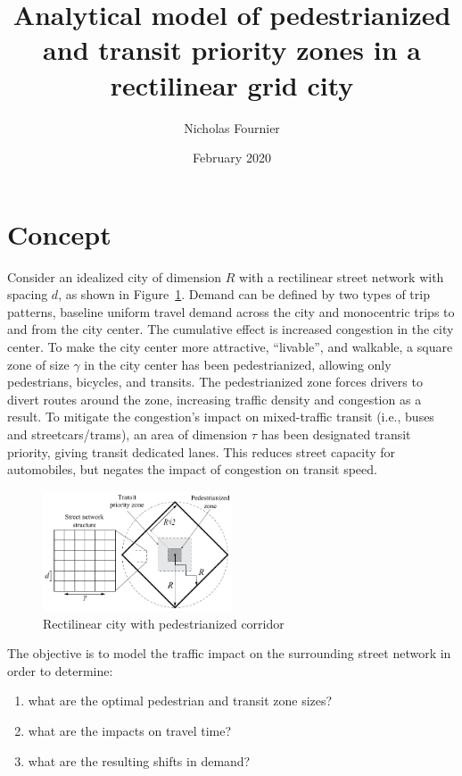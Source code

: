 \documentclass{article}
\title{Analytical model of pedestrianized and transit priority zones in a rectilinear grid city}
\author{Nicholas Fournier}
\date{February 2020}
\begin{document}
\maketitle

\section{Concept}
Consider an idealized city of dimension $R$ with a rectilinear street network with spacing $d$, as shown in Figure~\ref{fig:gridcity}. Demand can be defined by two types of trip patterns, baseline uniform travel demand across the city and monocentric trips to and from the city center. The cumulative effect is increased congestion in the city center. To make the city center more attractive, ``livable'', and walkable, a square zone of size $\gamma$ in the city center has been pedestrianized, allowing only pedestrians, bicycles, and transits. The pedestrianized zone forces drivers to divert routes around the zone, increasing traffic density and congestion as a result. To mitigate the congestion's impact on mixed-traffic transit (i.e., buses and streetcars/trams), an area of dimension $\tau$ has been designated transit priority, giving transit dedicated lanes. This reduces street capacity for automobiles, but negates the impact of congestion on transit speed.

\begin{figure}[!ht]
     \centering
     \includegraphics[width=0.5\textwidth]{diagram_pedtransit_grid_city}
     \caption{Rectilinear city with pedestrianized corridor}
     \label{fig:gridcity}
\end{figure}

\noindent The objective is to model the traffic impact on the surrounding street network in order to determine:
\begin{enumerate}[topsep=3pt, itemsep=3pt, partopsep=3pt, parsep=3pt]
    \itshape
    \item what are the optimal pedestrian and transit zone sizes?
    \item what are the impacts on travel time?
    \item what are the resulting shifts in demand?
\end{enumerate}
\end{document}
